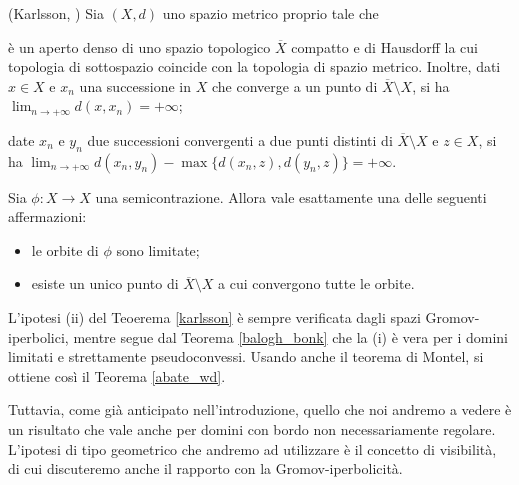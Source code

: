 \begin{thm} \label{karlsson}
    (Karlsson, \cite[Corollary 3.7]{Ka}) Sia $(X,d)$ uno spazio metrico proprio tale che
    \begin{nlist}
        \item è un aperto denso di uno spazio topologico $\overline{X}$ compatto e di Hausdorff la cui topologia di sottospazio coincide con la topologia di spazio metrico. Inoltre, dati $x \in X$ e $x_n$ una successione in $X$ che converge a un punto di $\overline{X}\setminus X$, si ha $\displaystyle\lim_{n\longrightarrow+\infty}d(x,x_n)=+\infty$;
        \item date $x_n$ e $y_n$ due successioni convergenti a due punti distinti di $\overline{X}\setminus X$ e $z \in X$, si ha $\displaystyle\lim_{n\longrightarrow+\infty} d(x_n,y_n)-\max\{d(x_n,z),d(y_n,z)\}=+\infty$.
    \end{nlist}
    Sia $\phi:X \longrightarrow X$ una semicontrazione. Allora vale esattamente una delle seguenti affermazioni:
    \begin{itemize}
        \item le orbite di $\phi$ sono limitate;
        \item esiste un unico punto di $\overline{X}\setminus X$ a cui convergono tutte le orbite.
    \end{itemize}
\end{thm}

L'ipotesi (ii) del Teoerema \ref{karlsson} è sempre verificata dagli spazi Gromov-iperbolici, mentre segue dal Teorema \ref{balogh_bonk} che la (i) è vera per i domini limitati e strettamente pseudoconvessi. Usando anche il teorema di Montel, si ottiene così il Teorema \ref{abate_wd}.

Tuttavia, come già anticipato nell'introduzione, quello che noi andremo a vedere è un risultato che vale anche per domini con bordo non necessariamente regolare. L'ipotesi di tipo geometrico che andremo ad utilizzare è il concetto di visibilità, di cui discuteremo anche il rapporto con la Gromov-iperbolicità.